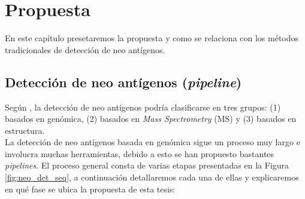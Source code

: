 \chapter{Propuesta}
\label{cap:propuesta}




En este capítulo presetaremos la propuesta y como se relaciona con los métodos tradicionales de detección de neo antígenos.

\section{Detección de neo antígenos (\textit{pipeline})}

Según \cite{gopanenko2020main}, la detección de neo antígenos podría clasificarse en tres grupos: (1) basados en genómica, (2) basados en \textit{Mass Spectrometry} (MS) y (3) basados en estructura. \\

La detección de neo antígenos basada en genómica sigue un proceso muy largo e involucra muchas herramientas, debido a esto se han propuesto bastantes \textit{pipelines}. El proceso general consta de varias etapas presentadas en la Figura \ref{fig:neo_det_seq}, a continuación detallaremos cada una de ellas y explicaremos en qué fase se ubica la propuesta de esta tesis:

